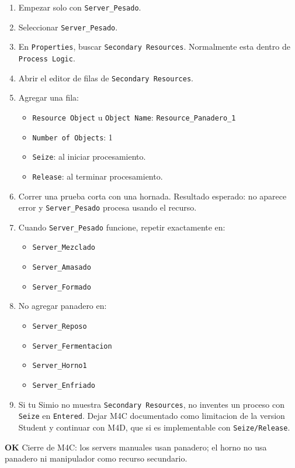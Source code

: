 \documentclass[11pt]{article}
\newcommand{\simio}[1]{\texttt{#1}}
\newcommand{\ok}{\textcolor{verdeok}{\textbf{OK}}}
\begin{document}
\begin{enumerate}
  \item Empezar solo con \simio{Server\_Pesado}.
  \item Seleccionar \simio{Server\_Pesado}.
  \item En \simio{Properties}, buscar \simio{Secondary Resources}. Normalmente esta dentro de \simio{Process Logic}.
  \item Abrir el editor de filas de \simio{Secondary Resources}.
  \item Agregar una fila:
  \begin{itemize}
    \item \simio{Resource Object} u \simio{Object Name}: \simio{Resource\_Panadero\_1}
    \item \simio{Number of Objects}: 1
    \item \simio{Seize}: al iniciar procesamiento.
    \item \simio{Release}: al terminar procesamiento.
  \end{itemize}
  \item Correr una prueba corta con una hornada. Resultado esperado: no aparece error y \simio{Server\_Pesado} procesa usando el recurso.
  \item Cuando \simio{Server\_Pesado} funcione, repetir exactamente en:
  \begin{itemize}
    \item \simio{Server\_Mezclado}
    \item \simio{Server\_Amasado}
    \item \simio{Server\_Formado}
  \end{itemize}
  \item No agregar panadero en:
  \begin{itemize}
    \item \simio{Server\_Reposo}
    \item \simio{Server\_Fermentacion}
    \item \simio{Server\_Horno1}
    \item \simio{Server\_Enfriado}
  \end{itemize}
  \item Si tu Simio no muestra \simio{Secondary Resources}, no inventes un proceso con \simio{Seize} en \simio{Entered}. Dejar M4C documentado como limitacion de la version Student y continuar con M4D, que si es implementable con \simio{Seize/Release}.
\end{enumerate}

\ok{} Cierre de M4C: los servers manuales usan panadero; el horno no usa panadero ni manipulador como recurso secundario.
\end{document}
